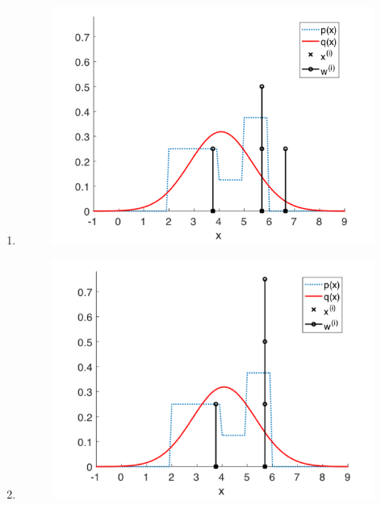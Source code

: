\begin{enumerate}
\begin{enumerate}
\item \begin{figure}[!htb]
\begin{center}
\includegraphics[scale=0.320]{img/particle_filters/P1_7_3_4_ex1.png}
\end{center}
\label{P1_7_3_4_ex1}
\end{figure}
\item \begin{figure}[!htb]
\begin{center}
\includegraphics[scale=0.320]{img/particle_filters/P2_7_3_4_ex1.png}
\end{center}
\label{P2_7_3_4_ex1}
\end{figure}

\end{enumerate}
\end{enumerate}
